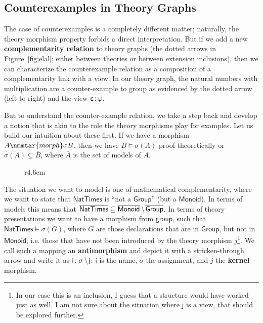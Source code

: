 \documentclass[11pt]{bluenote}
\def\modelsof#1{\overline{#1}}
\def\setdiff#1#2{#1\kern.2em\backslash\kern.1em #2}
\def\cn#1{\mathsf{#1}}
\def\defemph{\textbf}
\def\thmo#1#2{\cn{#1}\colon\kern-.15em{#2}}
\begin{document}
\subsection{Counterexamples in Theory Graphs}

The case of counterexamples is a completely different matter; naturally, the theory
morphism property forbids a direct interpretation. But if we add a new
\defemph{complementarity relation} to theory graphs (the dotted arrows in
Figure~\ref{fig:elal}; either between theories or between extension inclusions), then we
can characterize the counterexample relation as a composition of a complementarity link
with a view. In our theory graph, the natural numbers with multiplication are a
counter-example to group as evidenced by the dotted arrow (left to right) and the view
$\thmo{c}\varphi$.

But to understand the counter-example relation, we take a step back and develop a notion
that is akin to the role the theory morphisms play for examples. Let us build our
intuition about these first. If we have a morphism $A\nmmtar{morph}\sigma B$, then we
have $B\models\sigma(A)$ proof-theoretically or
$\modelsof{\sigma(A)}\subseteq\modelsof{B}$, where $\modelsof{A}$ is the set of models of
$A$.


\begin{wrapfigure}r{4.6cm}\vspace*{-1em}
\end{wrapfigure}
The situation we want to model is one of mathematical complementarity, where we want to
state that $\cn{NatTimes}$ is ``not a $\cn{Group}$'' (but a $\cn{Monoid}$). In terms of
models this means that $\modelsof{\cn{NatTimes}}\subseteq
\setdiff{\modelsof{\cn{Monoid}}}{\modelsof{\cn{Group}}}$.  In terms of theory
presentations we want to have a morphism from $\cn{group}$, such that
$\cn{NatTimes}\models\sigma(G)$, where $G$ are those declarations that are in
$\cn{Group}$, but not in $\cn{Monoid}$, i.e. those that have not been introduced by the
theory morphism $j$\footnote{In our case this is an inclusion, I guess that a structure
  would have worked just as well. I am not sure about the situation where $\cn{j}$ is a
  view, that should be explored further.}. We call such a mapping an
\defemph{antimorphism} and depict it with a stricken-through arrow and write it as
$\cn{i}\colon\setdiff\sigma{\cn{j}}$: $\cn{i}$ is the name, $\sigma$ the assignment, and
$j$ the \defemph{kernel} morphism.
\end{document}
